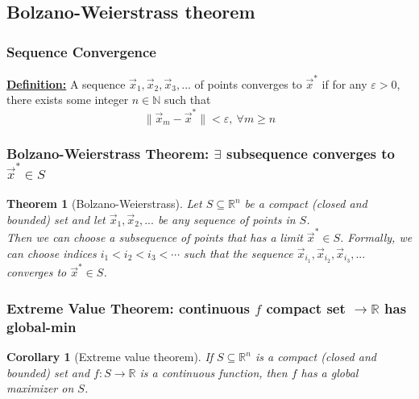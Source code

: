 \documentclass[11pt,a4paper]{article}
\newtheorem{theorem}{Theorem}
\newtheorem{corollary}{Corollary}
\begin{document}
\subsection{Bolzano-Weierstrass theorem}
\subsubsection{Sequence Convergence}
\textbf{\underline{Definition:}} A sequence $\vec{x}_1,\vec{x}_2,\vec{x}_3,...$ of points converges to $\vec{x}^*$ if for any $\varepsilon>0$, there exists some integer $n\in \mathbb{N}$ such that $$\|\vec{x}_m-\vec{x}^*\|<\varepsilon,\ \forall m\geq n$$

\subsubsection{Bolzano-Weierstrass Theorem: $\exists$ subsequence converges to $\vec{x}^*\in S$}
\begin{theorem}[Bolzano-Weierstrass]
    Let $S\subseteq \mathbb{R}^n$ be a compact (closed and bounded) set and let $\vec{x}_1,\vec{x}_2,...$ be any sequence of points in $S$.\\
    Then we can choose a subsequence of points that has a limit $\vec{x}^*\in S$. Formally, we can choose indices $i_1<i_2<i_3<\cdots$ such that the sequence $\vec{x}_{i_1},\vec{x}_{i_2},\vec{x}_{i_3},...$ converges to $\vec{x}^*\in S$.
\end{theorem}
\begin{center}
\end{center}

\subsubsection{Extreme Value Theorem: continuous $f$ compact set $\rightarrow \mathbb{R}$ has global-min}
\begin{corollary}[Extreme value theorem]
    If $S\subseteq \mathbb{R}^n$ is a compact (closed and bounded) set and $f: S \rightarrow \mathbb{R}$ is a continuous function, then $f$ has a global maximizer on $S$.
\end{corollary}
\end{document}
